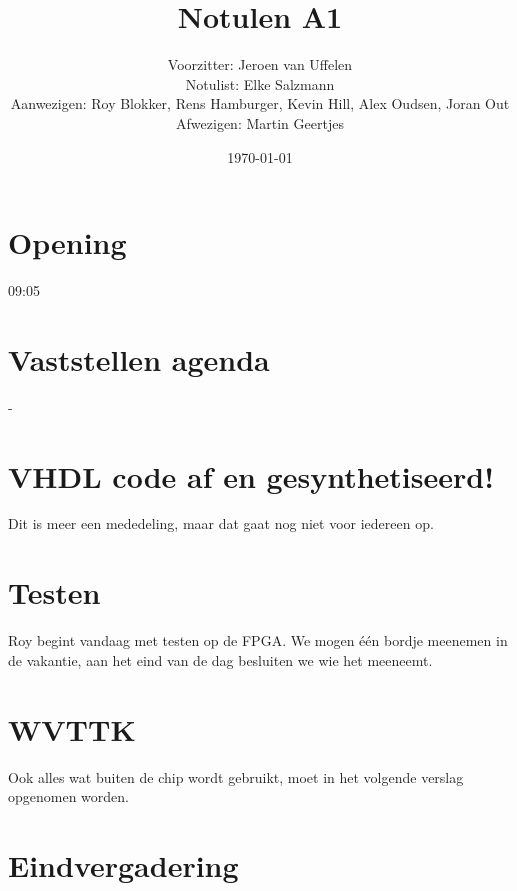 \documentclass[11pt,twoside,a4paper]{article}
\title{Notulen A1}
\author{
Voorzitter: Jeroen van Uffelen\\
Notulist: Elke Salzmann\\
Aanwezigen: Roy Blokker, Rens Hamburger, Kevin Hill, Alex Oudsen, Joran Out\\
Afwezigen: Martin Geertjes\\
}
\date{\today}
\begin{document}
\maketitle

\section{Opening}
09:05

\section{Vaststellen agenda}
-

\section{VHDL code af en gesynthetiseerd!}
Dit is meer een mededeling, maar dat gaat nog niet voor iedereen op. 

\section{Testen}
Roy begint vandaag met testen op de FPGA. We mogen \'e\'en bordje meenemen in de vakantie, aan het eind van de dag besluiten we wie het meeneemt.

\section{WVTTK}
Ook alles wat buiten de chip wordt gebruikt, moet in het volgende verslag opgenomen worden.

\section{Eindvergadering}
\end{document}
